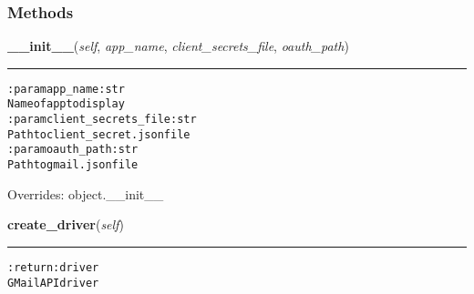 
  \subsubsection{Methods}

    \vspace{0.5ex}

\hspace{.8\funcindent}\begin{boxedminipage}{\funcwidth}

    \raggedright \textbf{\_\_init\_\_}(\textit{self}, \textit{app\_name}, \textit{client\_secrets\_file}, \textit{oauth\_path})

    \vspace{-1.5ex}

    \rule{\textwidth}{0.5\fboxrule}
\setlength{\parskip}{2ex}
\begin{alltt}

:param app\_name: str
    Name of app to display
:param client\_secrets\_file: str
    Path to client\_secret.json file
:param oauth\_path: str
    Path to gmail.json file
\end{alltt}

\setlength{\parskip}{1ex}
      Overrides: object.\_\_init\_\_

    \end{boxedminipage}

    \label{hal:internet:gmail:GMailApiOAuth:create_driver}

    \vspace{0.5ex}

\hspace{.8\funcindent}\begin{boxedminipage}{\funcwidth}

    \raggedright \textbf{create\_driver}(\textit{self})

    \vspace{-1.5ex}

    \rule{\textwidth}{0.5\fboxrule}
\setlength{\parskip}{2ex}
\begin{alltt}

:return: driver
    GMail API driver
\end{alltt}

\setlength{\parskip}{1ex}
    \end{boxedminipage}


